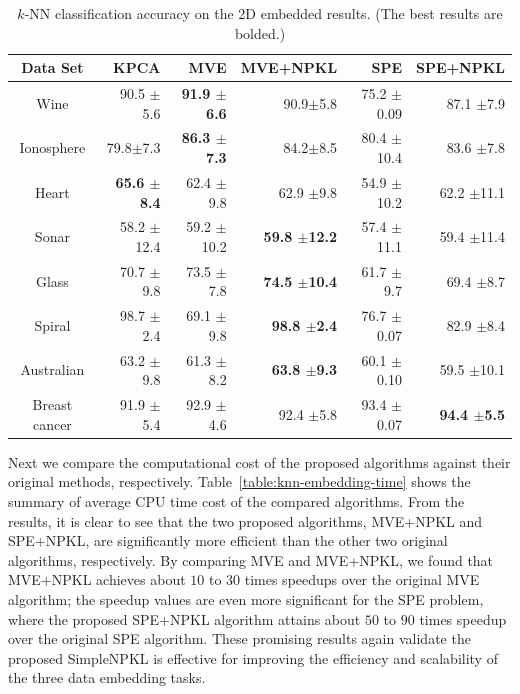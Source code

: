 \begin{table}[!hptb]
\centering
\begin{center}
\begin{tabular}{c | r | r r| r r }
\hline
Data Set    & KPCA &MVE &MVE+NPKL &SPE &SPE+NPKL \\

\hline
Wine   &90.5 $\pm$5.6 &{\bf 91.9 $\pm$6.6} &90.9$\pm$5.8   &75.2 $\pm$0.09  &87.1 $\pm$7.9\\

Ionosphere    &79.8$ \pm$7.3   &{\bf 86.3 $\pm$7.3}   &84.2$\pm$8.5   &80.4 $\pm$10.4    &83.6 $\pm$7.8\\

Heart    &{\bf 65.6 $\pm$8.4} &62.4 $\pm$9.8   &62.9 $\pm$9.8   &54.9 $\pm$10.2   &62.2 $\pm$11.1\\

Sonar    &58.2 $\pm$12.4   &59.2 $\pm$10.2   &{\bf 59.8 $\pm$12.2}   &57.4 $\pm$11.1   &59.4 $\pm$11.4\\

Glass     &70.7 $\pm$9.8    &73.5 $\pm$7.8    &{\bf 74.5 $\pm$10.4}  &61.7 $\pm$9.7  &69.4 $\pm$8.7\\

Spiral   &98.7 $\pm$2.4 &69.1 $\pm$9.8 &{\bf 98.8 $\pm$2.4} &76.7 $\pm$0.07 &82.9 $\pm$8.4\\

Australian   &63.2 $\pm$9.8   &61.3 $\pm$8.2 &{\bf 63.8 $\pm$9.3} &60.1 $\pm$ 0.10 &59.5 $\pm$10.1\\

Breast cancer   &91.9 $\pm$5.4 &92.9 $\pm$4.6 &92.4 $\pm$5.8 &93.4 $\pm$0.07 &{\bf 94.4 $\pm$5.5}\\

\hline
\end{tabular}
\end{center}%
\caption{$k$-NN classification accuracy on the 2D embedded results. (The best results are bolded.)}
\label{table:knn-embedding-acc}
\end{table}



Next we compare the computational cost of the proposed algorithms against their original methods, respectively. Table~\ref{table:knn-embedding-time} shows the summary of average CPU time cost of the compared algorithms. From the results, it is clear to see that the two proposed algorithms, MVE+NPKL and SPE+NPKL, are significantly more efficient than the other two original algorithms, respectively. By comparing MVE and MVE+NPKL, we found that MVE+NPKL achieves about $10$ to $30$ times speedups over the original MVE algorithm; the speedup values are even more significant for the SPE problem, where the proposed SPE+NPKL algorithm attains about $50$ to $90$ times speedup over the original SPE algorithm. These promising results again validate the proposed SimpleNPKL is effective for improving the efficiency and scalability of the three data embedding tasks.


